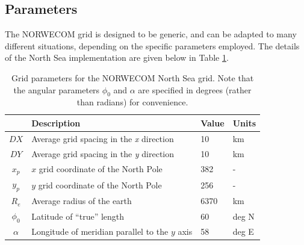 \documentclass[a4paper,10pt]{article}
\begin{document}
\subsection{Parameters}
The NORWECOM grid is designed to be generic, and can be adapted to many different situations, depending on the specific parameters employed. The details of the North Sea implementation are given below in Table \ref{tbl:NORWECOM_params}.
\begin{table}[h]
	\caption{Grid parameters for the NORWECOM North Sea grid. Note that the angular parameters $\phi_0$ and $\alpha$ are specified in degrees (rather than radians) for convenience.} 
	\centering
	\begin{tabular}{c l l l}
	\hline\hline 
	& Description & Value & Units\\ 
	\hline %
        $DX$ & Average grid spacing in the \textit{x} direction & 10 & km \\
        $DY$ & Average grid spacing in the \textit{y} direction & 10 & km \\
        $x_p$ & $x$ grid coordinate of the North Pole &  382& - \\
        $y_p$ & $y$ grid coordinate of the North Pole & 256& - \\
        $R_e$ & Average radius of the earth & 6370 & km \\
        $\phi_0$ & Latitude of ``true'' length & 60 & deg N\\
        $\alpha$ & Longitude of meridian parallel to the $y$ axis & 58 & deg E\\
	\hline 
	\end{tabular}
	\label{tbl:NORWECOM_params} %
\end{table}
\end{document}
